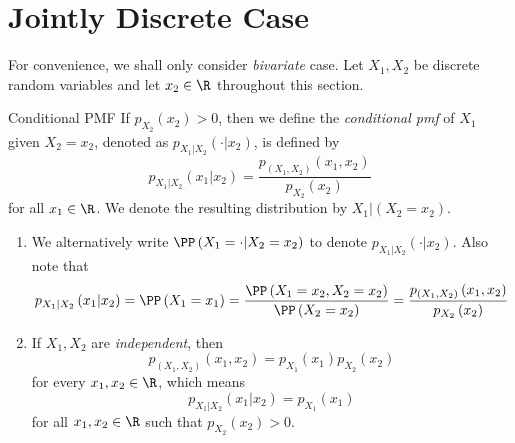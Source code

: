 \documentclass[stat333]{subfiles}
\begin{document}

    \section{Jointly Discrete Case}

    \np For convenience, we shall only consider \textit{bivariate} case. Let $X_1,X_2$ be discrete random variables and let $x_2\in\R$ throughout this section.
    
    \begin{definition}{Conditional PMF}{}
        If $p_{X_2}\left( x_2 \right)>0$, then we define the \emph{conditional pmf} of $X_1$ given $X_2=x_2$, denoted as $p_{X_1|X_2}\left( \cdot|x_2 \right)$, is defined by
        \begin{equation*}
            p_{X_1|X_2}\left( x_1|x_2 \right) = \frac{p_{\left( X_1,X_2 \right)}\left( x_1,x_2 \right)}{p_{X_2}\left( x_2 \right)}
        \end{equation*}
        for all $x_1\in\R$. We denote the resulting distribution by $X_1|\left( X_2=x_2 \right)$.
    \end{definition}

    \np 
    \begin{enumerate}
        \item We alternatively write $\PP\left( X_1=\cdot|X_2=x_2 \right)$ to denote $p_{X_1|X_2}\left( \cdot|x_2 \right)$. Also note that
            \begin{equation*}
                p_{X_1|X_2}\left( x_1|x_2 \right) 
                = \PP\left( X_1=x_1 \right)
                = \frac{\PP\left( X_1=x_2,X_2=x_2 \right)}{\PP\left( X_2=x_2 \right)}
                = \frac{p_{\left( X_1,X_2 \right)}\left( x_1,x_2 \right)}{p_{X_2}\left( x_2 \right)}
            \end{equation*}
        \item If $X_1,X_2$ are \textit{independent}, then
            \begin{equation*}
                p_{\left( X_1,X_2 \right)}\left( x_1,x_2 \right) = p_{X_1}\left( x_1 \right)p_{X_2}\left( x_2 \right)
            \end{equation*}
            for every $x_1,x_2\in\R$, which means
            \begin{equation*}
                p_{X_1|X_2}\left( x_1|x_2 \right)=p_{X_1}\left( x_1 \right)
            \end{equation*}
            for all $x_1,x_2\in\R$ such that $p_{X_2}\left( x_2 \right)>0$.
    \end{enumerate}
\end{document}
